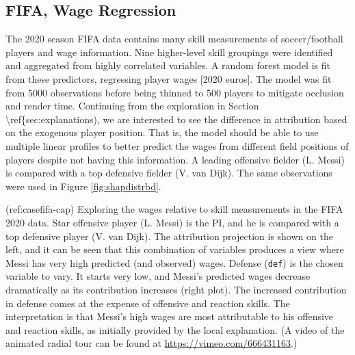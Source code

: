 \documentclass[
]{jss}
\begin{document}
\hypertarget{fifa-wage-regression}{%
\subsection{FIFA, Wage Regression}\label{fifa-wage-regression}}

The 2020 season FIFA data \citep{leone_fifa_2020, biecek_dalex_2018}
contains many skill measurements of soccer/football players and wage
information. Nine higher-level skill groupings were identified and
aggregated from highly correlated variables. A random forest model is
fit from these predictors, regressing player wages {[}2020 euros{]}. The
model was fit from 5000 observations before being thinned to 500 players
to mitigate occlusion and render time. Continuing from the exploration
in Section \textbackslash ref\{sec:explanations), we are interested to
see the difference in attribution based on the exogenous player
position. That is, the model should be able to use multiple linear
profiles to better predict the wages from different field positions of
players despite not having this information. A leading offensive fielder
(L. Messi) is compared with a top defensive fielder (V. van Dijk). The
same observations were used in Figure \ref{fig:shapdistrbd}.

(ref:casefifa-cap) Exploring the wages relative to skill measurements in
the FIFA 2020 data. Star offensive player (L. Messi) is the PI, and he
is compared with a top defensive player (V. van Dijk). The attribution
projection is shown on the left, and it can be seen that this
combination of variables produces a view where Messi has very high
predicted (and observed) wages. Defense (\texttt{def}) is the chosen
variable to vary. It starts very low, and Messi's predicted wages
decrease dramatically as its contribution increases (right plot). The
increased contribution in defense comes at the expense of offensive and
reaction skills. The interpretation is that Messi's high wages are most
attributable to his offensive and reaction skills, as initially provided
by the local explanation. (A video of the animated radial tour can be
found at \url{https://vimeo.com/666431163}.)
\end{document}
